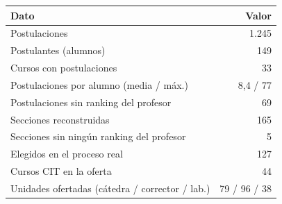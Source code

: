 \begin{tabular}{lr}
\toprule
\textbf{Dato} & \textbf{Valor} \\
\midrule
Postulaciones & 1.245 \\
Postulantes (alumnos) & 149 \\
Cursos con postulaciones & 33 \\
Postulaciones por alumno (media / máx.) & 8,4 / 77 \\
Postulaciones sin ranking del profesor & 69 \\
Secciones reconstruidas & 165 \\
Secciones sin ningún ranking del profesor & 5 \\
Elegidos en el proceso real & 127 \\
Cursos CIT en la oferta & 44 \\
Unidades ofertadas (cátedra / corrector / lab.) & 79 / 96 / 38 \\
\bottomrule
\end{tabular}
